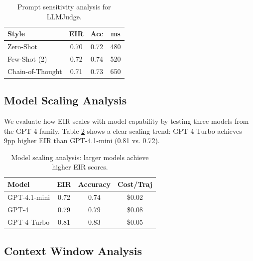 \documentclass{article}
\begin{document}
\begin{table}[h]
\caption{Prompt sensitivity analysis for LLMJudge.}
\label{tab:prompt_sensitivity}
\vskip 0.15in
\begin{center}
\begin{small}
\begin{sc}
\begin{tabular}{lccc}
\toprule
Style & EIR & Acc & ms \\
\midrule
Zero-Shot & 0.70 & 0.72 & 480 \\
Few-Shot (2) & 0.72 & 0.74 & 520 \\
Chain-of-Thought & 0.71 & 0.73 & 650 \\
\bottomrule
\end{tabular}
\end{sc}
\end{small}
\end{center}
\vskip -0.1in
\end{table}

\subsection{Model Scaling Analysis}

We evaluate how EIR scales with model capability by testing three models from the GPT-4 family. Table \ref{tab:model_scaling} shows a clear scaling trend: GPT-4-Turbo achieves 9pp higher EIR than GPT-4.1-mini (0.81 vs. 0.72).

\begin{table}[h]
\caption{Model scaling analysis: larger models achieve higher EIR scores.}
\label{tab:model_scaling}
\vskip 0.15in
\begin{center}
\begin{small}
\begin{sc}
\begin{tabular}{lccc}
\toprule
Model & EIR & Accuracy & Cost/Traj \\
\midrule
GPT-4.1-mini & 0.72 & 0.74 & \$0.02 \\
GPT-4 & 0.79 & 0.79 & \$0.08 \\
GPT-4-Turbo & 0.81 & 0.83 & \$0.05 \\
\bottomrule
\end{tabular}
\end{sc}
\end{small}
\end{center}
\vskip -0.1in
\end{table}

\subsection{Context Window Analysis}
\end{document}
